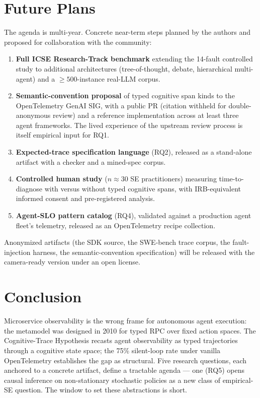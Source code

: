 \documentclass[10pt,conference]{IEEEtran}
\begin{document}
\section{Future Plans}
\label{sec:future}

The agenda is multi-year. Concrete near-term steps planned by the
authors and proposed for collaboration with the community:

\begin{enumerate}[leftmargin=*,nosep]
\item \textbf{Full ICSE Research-Track benchmark} extending the 14-fault
controlled study to additional architectures (tree-of-thought,
debate, hierarchical multi-agent) and a $\geq 500$-instance real-LLM
corpus.
\item \textbf{Semantic-convention proposal} of typed cognitive span
kinds to the OpenTelemetry GenAI SIG, with a public PR (citation
withheld for double-anonymous review) and a reference implementation
across at least three agent frameworks. The lived experience of the
upstream review process is itself empirical input for RQ1.
\item \textbf{Expected-trace specification language} (RQ2), released
as a stand-alone artifact with a checker and a mined-spec corpus.
\item \textbf{Controlled human study} ($n \approx 30$ SE practitioners)
measuring time-to-diagnose with versus without typed cognitive
spans, with IRB-equivalent informed consent and pre-registered
analysis.
\item \textbf{Agent-SLO pattern catalog} (RQ4), validated against a
production agent fleet's telemetry, released as an OpenTelemetry
recipe collection.
\end{enumerate}

Anonymized artifacts (the SDK source, the SWE-bench trace corpus,
the fault-injection harness, the semantic-convention specification)
will be released with the camera-ready version under an open
license.

\section{Conclusion}

Microservice observability is the wrong frame for autonomous agent
execution: the metamodel was designed in 2010 for typed RPC over fixed
action spaces. The Cognitive-Trace Hypothesis recasts agent
observability as typed trajectories through a cognitive state space;
the 75\% silent-loop rate under vanilla OpenTelemetry establishes the
gap as structural. Five research questions, each anchored to a
concrete artifact, define a tractable agenda --- one (RQ5) opens
causal inference on non-stationary stochastic policies as a new class
of empirical-SE question. The window to set these abstractions is
short.

\balance


\end{document}
